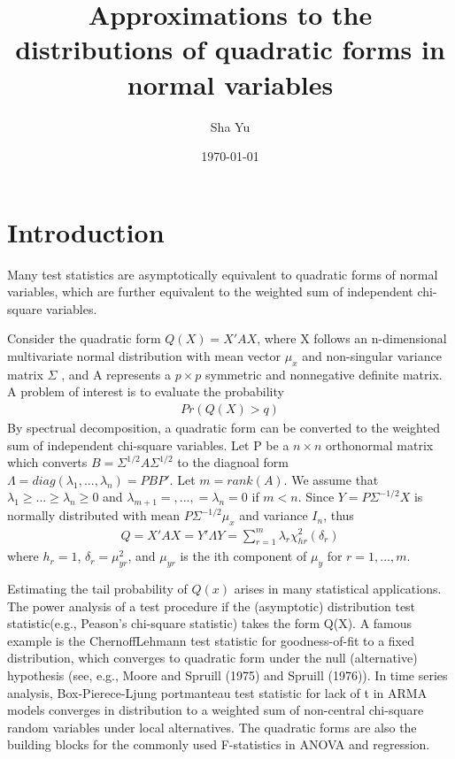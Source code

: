 \documentclass[paper=a4]{article}
\title{Approximations to the distributions of quadratic forms in normal variables}
\author{Sha Yu}
\date{\today}
\numberwithin{equation}{section}
\begin{document}
\maketitle

\section{Introduction}
Many test statistics are asymptotically equivalent to quadratic forms of normal variables,
which are further equivalent to the weighted sum of independent chi-square variables.

Consider the quadratic form $Q(X)=X'AX$, where X follows an n-dimensional multivariate normal distribution with mean vector $\mu_x$ and non-singular variance matrix $\Sigma$	, and A represents a $p \times p$ symmetric and nonnegative definite matrix. A problem of interest is to evaluate the probability  
\begin{align}
Pr(Q(X)>q)
\end{align}
By spectrual decomposition, a quadratic form can be converted to the weighted sum of independent chi-square variables. Let P be a $n \times n$ orthonormal matrix which converts $B={\Sigma}^{1/2}A{\Sigma}^{1/2}$ to the diagnoal form $\Lambda=diag(\lambda_1,...,\lambda_n)=PBP'$. Let $m=rank(A)$. We assume that $\lambda_1\geq...\geq\lambda_n\ge0$ and $\lambda_{m+1}=,..., =\lambda_n =0$ if $m<n$. Since $Y=P\Sigma^{-1/2}X$ is normally distributed with mean $P\Sigma^{-1/2}\mu_x$ and variance $I_n$, thus	
\begin{align}
Q=X'AX=Y'{\Lambda}Y=\sum_{r=1}^m\lambda_r\chi_{hr}^2(\delta_r)
\end{align}
where $h_r=1$, $\delta_r=\mu_{yr}^2$, and $\mu_{yr}$ is the ith component of $\mu_y$ for $r=1,...,m$.

Estimating the tail probability of $Q(x)$ arises in many statistical applications. The power analysis of a test procedure if the (asymptotic) distribution test statistic(e.g., Peason's chi-square statistic) takes the form Q(X). A famous example is the ChernoffLehmann test statistic for goodness-of-fit to a fixed distribution, which converges to quadratic form under the null (alternative) hypothesis (see, e.g., Moore and Spruill (1975) and Spruill (1976)). In time series analysis, Box-Pierece-Ljung portmanteau test statistic for lack of t in ARMA models converges in distribution to a weighted sum of non-central chi-square random variables under local alternatives. The quadratic forms are also the building
blocks for the commonly used F-statistics in ANOVA and regression.
\end{document}
